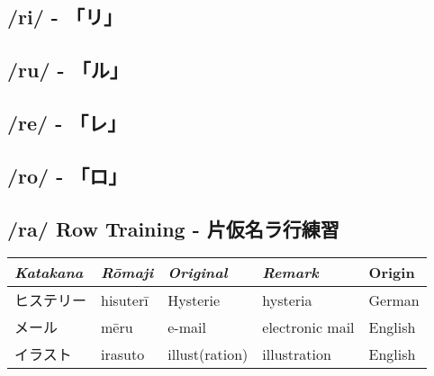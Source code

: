 

\subsection{/ri/ - 「リ」} \label{sec:KatakanaRi}

 

\subsection{/ru/ - 「ル」} \label{sec:KatakanaRu}

 

\subsection{/re/ - 「レ」} \label{sec:KatakanaRe}

 

\subsection{/ro/ - 「ロ」} \label{sec:KatakanaRa}

 

\subsection{/ra/ Row Training - 片仮名ラ行練習}
\Padding
\begin{longtable}[c]{p{2cm}p{1.5cm}p{2.5cm}p{3cm}p{6cm}}
\textit{Katakana}&\textit{Rōmaji}&\textit{Original}&\textit{Remark}&Origin\\\hline
ヒステリー  &hisuterī  &Hysterie      &hysteria               &German\\
メール      &mēru      &e-mail        &electronic mail        &English\\
イラスト    &irasuto   &illust(ration)&illustration           &English\\
\end{longtable}
\Padding



